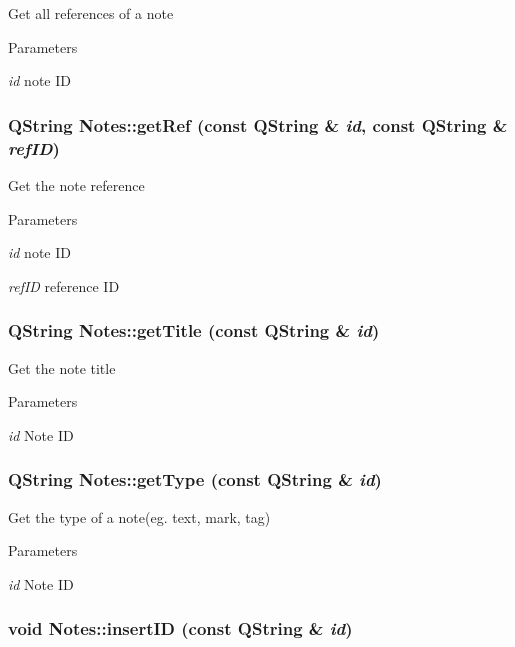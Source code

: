 \label{classNotes_a2452989d91340c9158210421a5d16362}
Get all references of a note 
\begin{DoxyParams}{Parameters}
\item[{\em id}]note ID \end{DoxyParams}
\hypertarget{classNotes_ae1fdbee2ecd121c81c7eb1c48404094d}{
\subsubsection[{getRef}]{\setlength{\rightskip}{0pt plus 5cm}QString Notes::getRef (const QString \& {\em id}, \/  const QString \& {\em refID})}}
\label{classNotes_ae1fdbee2ecd121c81c7eb1c48404094d}
Get the note reference 
\begin{DoxyParams}{Parameters}
\item[{\em id}]note ID \item[{\em refID}]reference ID \end{DoxyParams}
\hypertarget{classNotes_a784bbf981f20f1ffc9a07c32d1f2ad2f}{
\subsubsection[{getTitle}]{\setlength{\rightskip}{0pt plus 5cm}QString Notes::getTitle (const QString \& {\em id})}}
\label{classNotes_a784bbf981f20f1ffc9a07c32d1f2ad2f}
Get the note title 
\begin{DoxyParams}{Parameters}
\item[{\em id}]Note ID \end{DoxyParams}
\hypertarget{classNotes_a8fe0144e2c4f5566f1ba03545dba94e4}{
\subsubsection[{getType}]{\setlength{\rightskip}{0pt plus 5cm}QString Notes::getType (const QString \& {\em id})}}
\label{classNotes_a8fe0144e2c4f5566f1ba03545dba94e4}
Get the type of a note(eg. text, mark, tag) 
\begin{DoxyParams}{Parameters}
\item[{\em id}]Note ID \end{DoxyParams}
\hypertarget{classNotes_a08ba874a751ba5fde4620ac5b5ff8037}{
\subsubsection[{insertID}]{\setlength{\rightskip}{0pt plus 5cm}void Notes::insertID (const QString \& {\em id})}}
